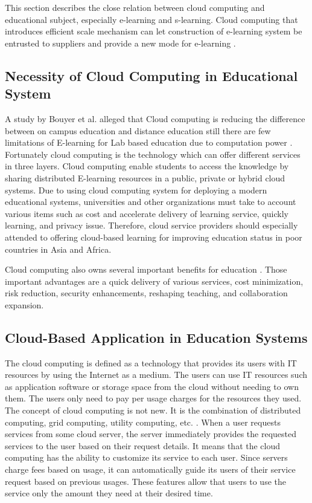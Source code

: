 \documentclass[journal]{vgtc}                %
\begin{document}
This section describes the close relation between cloud computing and educational subject, especially e-learning and s-learning. Cloud computing that introduces efficient scale mechanism can let construction of e-learning system be entrusted to suppliers and provide a new mode for e-learning \cite{Laisheng2011}.

  \subsection{Necessity of Cloud Computing in Educational System}
  A study by Bouyer et al. alleged that Cloud computing is reducing the difference between on campus education and distance education still there are few limitations of E-learning for Lab based education due to computation power \cite{Bouyer2014}. Fortunately cloud computing is the technology which can offer different services in three layers. Cloud computing enable students to access the knowledge by sharing distributed E-learning resources in a public, private or hybrid cloud systems. Due to using cloud computing system for deploying a modern educational systems, universities and other organizations must take to account various items such as cost and accelerate delivery of learning service, quickly learning, and privacy issue. Therefore, cloud service providers should especially attended to offering cloud-based learning for improving education status in poor countries in Asia and Africa.

  Cloud computing also owns several important benefits for education \cite{Bouyer2014}. Those important advantages are a quick delivery of various services, cost minimization, risk reduction, security enhancements, reshaping teaching, and collaboration expansion.

  \subsection{Cloud-Based Application in Education Systems}
  The cloud computing is defined as a technology that provides its users with IT resources by using the Internet as a medium. The users can use IT resources such as application software or storage space from the cloud without needing to own them. The users only need to pay per usage charges for the resources they used. The concept of cloud computing is not new. It is the combination of distributed computing, grid computing, utility computing, etc. \cite{s110807835}. When a user requests services from some cloud server, the server immediately provides the requested services to the user based on their request details. It means that the cloud computing has the ability to customize its service to each user. Since servers charge fees based on usage, it can automatically guide its users of their service request based on previous usages. These features allow that users to use the service only the amount they need at their desired time.
  
\end{document}
